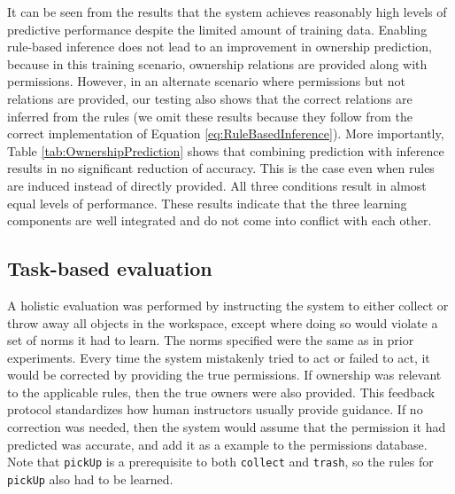 \documentclass[letterpaper]{article} %
\begin{document}
It can be seen from the results that the system achieves reasonably high levels of predictive performance despite the limited amount of training data. Enabling rule-based inference does not lead to an improvement in ownership prediction, because in this training scenario, ownership relations are provided along with permissions. However, in an alternate scenario where permissions but not relations are provided, our testing also shows that the correct relations are inferred from the rules (we omit these results because they follow from the correct implementation of Equation \ref{eq:RuleBasedInference}). More importantly, Table \ref{tab:OwnershipPrediction} shows that combining prediction with inference results in no significant reduction of accuracy. This is the case even when rules are induced instead of directly provided. All three conditions result in almost equal levels of performance. These results indicate that the three learning components are well integrated and do not come into conflict with each other.

\subsection{Task-based evaluation}

A holistic evaluation was performed by instructing the system to either collect or throw away all objects in the workspace, except where doing so would violate a set of norms it had to learn. The norms specified were the same as in prior experiments. Every time the system mistakenly tried to act or failed to act, it would be corrected by providing the true permissions. If ownership was relevant to the applicable rules, then the true owners were also provided. This feedback protocol standardizes how human instructors usually provide guidance. If no correction was needed, then the system would assume that the permission it had predicted was accurate, and add it as a example to the permissions database. Note that \texttt{\small pickUp} is a prerequisite to both \texttt{\small collect} and \texttt{\small trash}, so the rules for \texttt{\small pickUp} also had to be learned.
\end{document}
